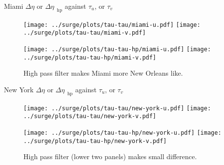 \begin{frame}{Miami $\Delta\eta$ or $\Delta\eta_{\;\;\mathrm{hp}}$ against $\tau_u$, or $\tau_v$}
\vspace{-30pt}
\hspace{-30pt}
 \begin{minipage}{1.1\textwidth}
\begin{figure}[htb!]
    \centering
   \hspace{-40pt} \texttt{[image: ../surge/plots/tau-tau/miami-u.pdf]}
        \texttt{[image: ../surge/plots/tau-tau/miami-v.pdf]}

   \hspace{-40pt} \texttt{[image: ../surge/plots/tau-tau-hp/miami-u.pdf]}
        \texttt{[image: ../surge/plots/tau-tau-hp/miami-v.pdf]}
    \vspace{-15pt}
    \caption{High pass filter makes Miami more New Orleans like.}
    \label{fig:A}
\end{figure}
\end{minipage}
\end{frame}


\begin{frame}{New York $\Delta\eta$ or
              $\Delta\eta_{\;\;\mathrm{hp}}$ against $\tau_u$, or $\tau_v$}
\vspace{-30pt}
\hspace{-30pt}
 \begin{minipage}{1.1\textwidth}
\begin{figure}[htb!]
    \centering
   \hspace{-40pt} \texttt{[image: ../surge/plots/tau-tau/new-york-u.pdf]}
        \texttt{[image: ../surge/plots/tau-tau/new-york-v.pdf]}

   \hspace{-40pt} \texttt{[image: ../surge/plots/tau-tau-hp/new-york-u.pdf]}
        \texttt{[image: ../surge/plots/tau-tau-hp/new-york-v.pdf]}
    \vspace{-15pt}
    \caption{High pass filter (lower two panels) makes small difference.}
    \label{fig:A}
\end{figure}
\end{minipage}
\end{frame}

